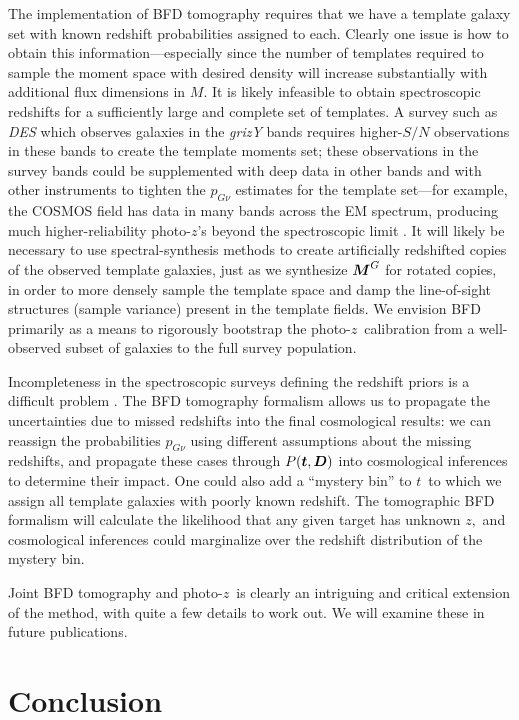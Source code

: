 \documentclass[11pt,preprint,flushrt]{aastex}
\newcommand\eg{{\it e.g.\/}}
\newcommand{\vecD}{\mbox{\boldmath $D$}}
\newcommand{\vecM}{\mbox{\boldmath $M$}}
\newcommand{\vect}{\mbox{\boldmath $t$}}
\newcommand{\photoz}{photo-$z$}
\begin{document}
The implementation of BFD tomography requires that we have a template
galaxy set with known redshift probabilities assigned to each. 
Clearly one issue is how to obtain this information---especially since
the number of templates required to sample the moment space with
desired density will increase substantially with additional flux
dimensions in \vecM.  
It is likely infeasible to obtain spectroscopic redshifts for a
sufficiently large and complete set of templates.
A survey such as \emph{DES} which observes galaxies in the {\it grizY}
bands requires higher-$S/N$ observations in these bands to create the
template moments set; these observations in the survey bands could be
supplemented with deep data in other bands and with other instruments to tighten
the $p_{G\nu}$ estimates for the template set---for example, the
COSMOS field has data in many bands across the EM spectrum, producing
much higher-reliability \photoz's beyond the spectroscopic limit
\citep{ilbert}.  It will likely be necessary to use spectral-synthesis
methods to create artificially redshifted copies of the observed
template galaxies, just as we synthesize $\vecM^G$ for
rotated copies, 
in order to more densely sample the template space and damp the
line-of-sight structures
(sample variance)
present in the template fields. We envision BFD primarily as a means to
rigorously bootstrap the \photoz\ calibration from a well-observed subset of
galaxies to the full survey population.

Incompleteness in the spectroscopic surveys defining the redshift
priors is a difficult problem \citep[see \eg][]{BH08}.  The BFD tomography
formalism allows us to propagate the uncertainties due to missed
redshifts into the final cosmological results: we can reassign the
probabilities $p_{G\nu}$ using different assumptions about the missing
redshifts, and propagate these cases through
$P(\vect, \vecD)$ into cosmological inferences to determine their
impact.  One could also add a ``mystery bin'' to \vect\ to which we
assign all template galaxies with poorly known redshift.  The
tomographic BFD formalism will calculate the likelihood that any given
target has unknown $z,$ and cosmological inferences could marginalize
over the redshift distribution of the mystery bin.

Joint BFD tomography and \photoz\ is clearly an intriguing and
critical extension of the method, with quite a few details to work
out.  We will examine these in future publications.


\section{Conclusion}
\end{document}
